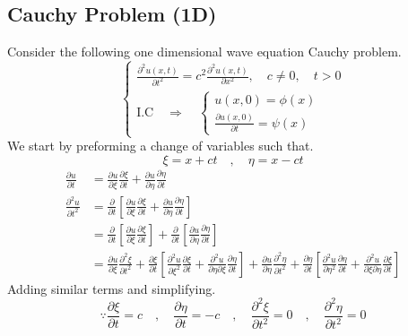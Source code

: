 \documentclass[]{article}
\begin{document}
\subsection{Cauchy Problem (1D)}
Consider the following one dimensional wave equation Cauchy problem.
\begin{equation}
    \begin{cases}
        \displaystyle \frac{\partial^2 u\left(x,t \right)}{\partial t^2} = c^2\frac{\partial^2 u\left(x,t \right)}{\partial x^2},\quad c\neq 0,\quad t>0
        \\
        \text{I.C} \quad \Longrightarrow \quad 
        \begin{cases}
            u\left(x,0 \right) = \phi\left(x\right)
            \\
            \displaystyle \frac{\partial u\left(x,0 \right)}{\partial t} = \psi\left(x\right)
        \end{cases}
    \end{cases}
\end{equation}
We start by preforming a change of variables such that.
\[
    \xi = x+ct \quad , \quad \eta = x-ct    
\]
\begin{align*}
\frac{\partial u}{\partial t} &= \frac{\partial u}{\partial \xi}\frac{\partial \xi}{\partial t} + \frac{\partial u}{\partial \eta} \frac{\partial \eta}{\partial t}
\\
\frac{\partial^2 u}{\partial t^2} &= \frac{\partial}{\partial t}\left[ \frac{\partial u}{\partial \xi}\frac{\partial \xi}{\partial t} + \frac{\partial u}{\partial \eta} \frac{\partial \eta}{\partial t}\right]
\\
&= \frac{\partial}{\partial t}\left[ \frac{\partial u}{\partial \xi}\frac{\partial \xi}{\partial t}\right] + \frac{\partial}{\partial t}\left[\frac{\partial u}{\partial \eta} \frac{\partial \eta}{\partial t}\right]
\\
&= \frac{\partial u}{\partial \xi}\frac{\partial^2 \xi}{\partial t^2} + \frac{\partial \xi}{\partial t}\left[\frac{\partial^2 u}{\partial \xi^2}\frac{\partial \xi}{\partial t} + \frac{\partial^2 u}{\partial\eta \partial\xi}\frac{\partial \eta}{\partial t} \right]+\frac{\partial u}{\partial \eta}\frac{\partial^2 \eta}{\partial t^2}+\frac{\partial \eta}{\partial t}\left[\frac{\partial^2 u}{\partial \eta^2}\frac{\partial \eta}{\partial t}+\frac{\partial^2 u}{\partial\xi\partial\eta}\frac{\partial\xi}{\partial t}\right]
\end{align*}
Adding similar terms and simplifying.
\[
\because \frac{\partial\xi}{\partial t}=c \quad,\quad \frac{\partial\eta}{\partial t}=-c \quad,\quad \frac{\partial^2\xi}{\partial t^2}=0 \quad,\quad \frac{\partial^2\eta}{\partial t^2}=0    
\]
\end{document}
